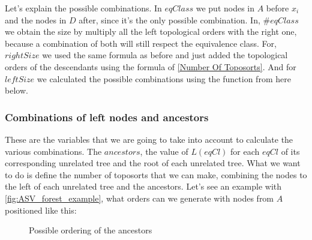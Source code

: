 Let's explain the possible combinations. In $eqClass$ we put nodes in $A$ before $x_i$ and the nodes in $D$ after, since it's the only possible combination. In, $\#eqClass$ we obtain the size by multiply all the left topological orders with the right one, because a combination of both will still respect the equivalence class.  For, $rightSize$ we used the same formula as before and just added the topological orders of the descendants using the formula of \ref{Number Of Toposorts}. And for $leftSize$ we calculated the possible combinations using the function from here below. 

\subsubsection{Combinations of left nodes and ancestors}

These are the variables that we are going to take into account to calculate the various combinations. The $ancestors$, the value of $L(eqCl)$ for each $eqCl$ of its corresponding unrelated tree and the root of each unrelated tree. What we want to do is define the number of toposorts that we can make, combining the nodes to the left of each unrelated tree and the ancestors.  Let's see an example with \ref{fig:ASV_forest_example}, what orders can we generate with nodes from $A$ positioned like this:

\begin{figure}[ht]
    \centering
    \caption{Possible ordering of the ancestors}
    \label{fig:order_of_ancestors}
\end{figure}


